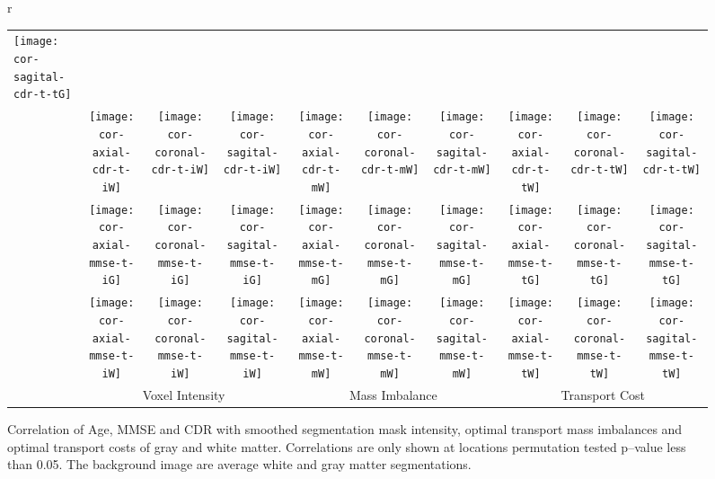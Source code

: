 \documentclass{llncs}
\begin{document}
\begin{figure}[h!]
\begin{tabular}{r}
\begin{tabular}{l||ccc||ccc||ccc}
\texttt{[image: cor-sagital-cdr-t-tG]} 
  \\
  &
\texttt{[image: cor-axial-cdr-t-iW]} &
\texttt{[image: cor-coronal-cdr-t-iW]} &
\texttt{[image: cor-sagital-cdr-t-iW]} &
\texttt{[image: cor-axial-cdr-t-mW]} &
\texttt{[image: cor-coronal-cdr-t-mW]} &
\texttt{[image: cor-sagital-cdr-t-mW]} &
\texttt{[image: cor-axial-cdr-t-tW]} &
\texttt{[image: cor-coronal-cdr-t-tW]} &
\texttt{[image: cor-sagital-cdr-t-tW]} 
  \\ \hline 
  \multirow{2}{*}{\rotatebox[origin=c]{90}{MMSE}} &
\texttt{[image: cor-axial-mmse-t-iG]} &
\texttt{[image: cor-coronal-mmse-t-iG]} &
\texttt{[image: cor-sagital-mmse-t-iG]} &
\texttt{[image: cor-axial-mmse-t-mG]} &
\texttt{[image: cor-coronal-mmse-t-mG]} &
\texttt{[image: cor-sagital-mmse-t-mG]} &
\texttt{[image: cor-axial-mmse-t-tG]} &
\texttt{[image: cor-coronal-mmse-t-tG]} &
\texttt{[image: cor-sagital-mmse-t-tG]} 
  \\ 
  &
\texttt{[image: cor-axial-mmse-t-iW]} &
\texttt{[image: cor-coronal-mmse-t-iW]} &
\texttt{[image: cor-sagital-mmse-t-iW]} &
\texttt{[image: cor-axial-mmse-t-mW]} &
\texttt{[image: cor-coronal-mmse-t-mW]} &
\texttt{[image: cor-sagital-mmse-t-mW]} &
\texttt{[image: cor-axial-mmse-t-tW]} &
\texttt{[image: cor-coronal-mmse-t-tW]} &
\texttt{[image: cor-sagital-mmse-t-tW]} 
  \\ \hline  \hline
  & \multicolumn{3}{c||}{Voxel Intensity}
  & \multicolumn{3}{c||}{Mass Imbalance}
  & \multicolumn{3}{c}{Transport Cost}
\end{tabular}
\end{tabular}
\caption{\label{fig:cor-oasis}
Correlation of Age, MMSE and CDR with smoothed segmentation mask intensity,
optimal transport mass imbalances and optimal transport costs of gray and white
matter.  Correlations are only shown at locations permutation tested p--value
less than 0.05. The background image are average white and gray matter
segmentations. 
\vspace{-7mm}
} 
\end{figure} 
\endgroup
\end{document}
